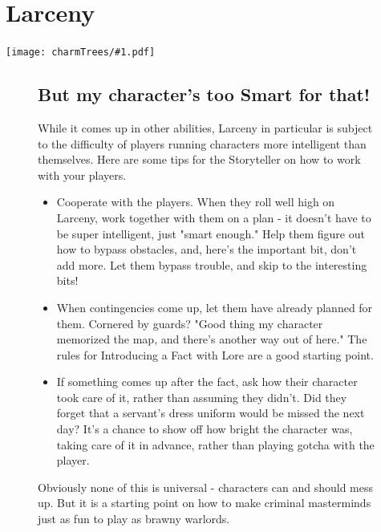 \documentclass[oneside]{book}
\newlength{\sidewidth}
\newenvironment{sidebarPartial}[2][]{%
   \def\imgcmd{\texttt{[image: \#2]}}%
   \begin{lrbox}{\mysavebox}%
   \begin{minipage}%
}{%
   \end{minipage}
   \end{lrbox}%
   \sbox\mysavebox{\fbox{\usebox\mysavebox}}%
   \mbox{\rlap{\raisebox{-\dp\mysavebox}{\imgcmd}}\usebox\mysavebox}%
}
\newenvironment{sidebar}[1]{%
  \begin{figure}[tb]%
  \begin{sidebarPartial}{resources/bg-sidebar.jpg}{\textwidth}%
  \vspace{6pt}
  \subsection*{#1}\vspace{6pt}%
  \centering
  \begin{minipage}{\sidewidth}
}
{
  \end{minipage}
  \vspace{6pt}
  \end{sidebarPartial}
  \end{figure}
}
\newenvironment{Ability}[1]{%
  \section{#1}%
  \vspace{-0.25in}\hspace*{-0.75in}\texttt{[image: charmTrees/\#1.pdf]}%
  \begin{multicols}{2}
}
{
  \end{multicols}
}
\begin{document}
\begin{Ability}{Larceny}
\begin{sidebar}{But my character's too Smart for that!}
  While it comes up in other abilities, Larceny in particular is subject to the difficulty of players running characters more intelligent than themselves. Here are some tips for the Storyteller on how to work with your players.

  \begin{itemize}
    \item Cooperate with the players. When they roll well high on Larceny, work together with them on a plan - it doesn't have to be super intelligent, just "smart enough." Help them figure out how to bypass obstacles, and, here's the important bit, don't add more. Let them bypass trouble, and skip to the interesting bits!
    \item When contingencies come up, let them have already planned for them. Cornered by guards? "Good thing my character memorized the map, and there's another way out of here." The rules for Introducing a Fact with Lore are a good starting point.
    \item If something comes up after the fact, ask how their character took care of it, rather than assuming they didn't. Did they forget that a servant's dress uniform would be missed the next day? It's a chance to show off how bright the character was, taking care of it in advance, rather than playing gotcha with the player.
  \end{itemize}

  Obviously none of this is universal - characters can and should mess up. But it is a starting point on how to make criminal masterminds just as fun to play as brawny warlords.
\end{sidebar}


\end{Ability}
\end{document}
